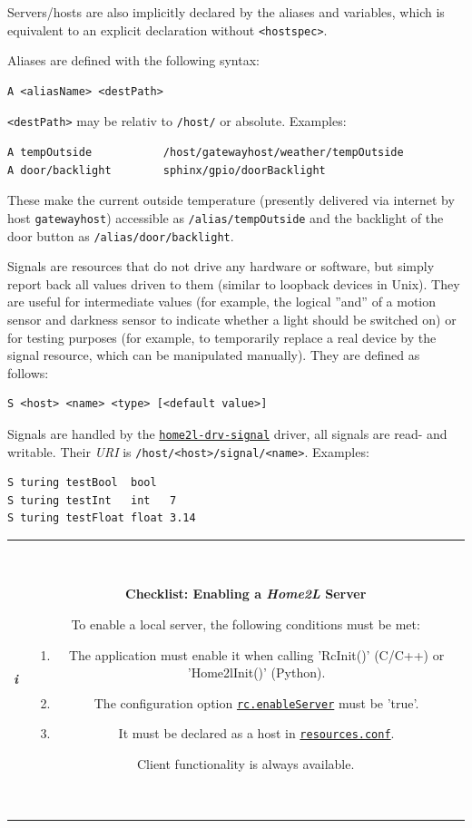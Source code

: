 \documentclass[12pt,english,parskip=half]{scrreprt}
\newcommand{\infobox}[1]{
  \hfill
  \setlength\arrayrulewidth{1pt}
  \begin{tabular}[t]{c|c|}
    \parbox{1.8em}{\hfill\textit{\Huge\textbf{i}\,}}
    &
    \,\parbox{0.89\linewidth}{\setlength{\parskip}{0.5em}#1}\,
  \end{tabular}
  \par
}
\newcommand{\idx}[1]{#1\index{#1}}
\newcommand{\envref}[1]{\hyperref[env:#1]{\texttt{#1}}}        %
\newcommand{\toolref}[1]{\hyperref[tool:#1]{\texttt{\idx{#1}}}}
\begin{document}
Servers/hosts are also implicitly declared by the aliases and variables,
which is equivalent to an explicit declaration without \verb|<hostspec>|.

Aliases are defined with the following syntax:

\begin{lstlisting}
A <aliasName> <destPath>
\end{lstlisting}

\verb|<destPath>| may be relativ to \texttt{/host/} or absolute.
Examples:

\begin{lstlisting}
A tempOutside           /host/gatewayhost/weather/tempOutside
A door/backlight        sphinx/gpio/doorBacklight
\end{lstlisting}

These make the current outside temperature (presently delivered via
internet by host \texttt{gatewayhost}) accessible as
\texttt{/alias/tempOutside} and the backlight of the door button as
\texttt{/alias/door/backlight}.

Signals are resources that do not drive any hardware or software, but
simply report back all values driven to them (similar to loopback
devices in Unix). They are useful for intermediate values (for example,
the logical ''and'' of a motion sensor and darkness sensor to indicate
whether a light should be switched on) or for testing purposes (for
example, to temporarily replace a real device by the signal resource,
which can be manipulated manually). They are defined as follows:

\begin{lstlisting}
S <host> <name> <type> [<default value>]
\end{lstlisting}

Signals are handled by the \toolref{home2l-drv-signal} driver, all signals are
read- and writable. Their \emph{URI} is \texttt{/host/<host>/signal/<name>}.
Examples:

\begin{lstlisting}
S turing testBool  bool
S turing testInt   int   7
S turing testFloat float 3.14
\end{lstlisting}


\infobox{
  \textbf{Checklist: Enabling a \emph{Home2L} Server}

  To enable a local server, the following conditions must be met:
  \begin{enumerate}
    \item The application must enable it when calling 'RcInit()' (C/C++) or 'Home2lInit()' (Python).
    \item The configuration option \envref{rc.enableServer} must be 'true'.
    \item It must be declared as a host in \toolref{resources.conf}.
  \end{enumerate}
   Client functionality is always available.
}
\end{document}
